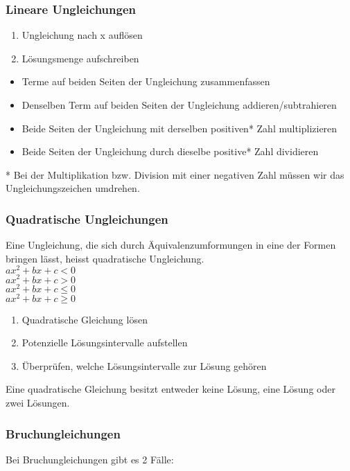 \begin{multicols}{2}
    \subsubsection{Lineare Ungleichungen}
    \vspace{-4mm}
    \begin{enumerate}
        \item Ungleichung nach x auflösen
        \item Lösungsmenge aufschreiben
    \end{enumerate}
    \begin{itemize}
        \item Terme auf beiden Seiten der Ungleichung zusammenfassen
        \item Denselben Term auf beiden Seiten der Ungleichung addieren/subtrahieren
        \item Beide Seiten der Ungleichung mit derselben positiven* Zahl multiplizieren
        \item Beide Seiten der Ungleichung durch dieselbe positive* Zahl dividieren
    \end{itemize}
    * Bei der Multiplikation bzw. Division mit einer negativen Zahl müssen wir das Ungleichungszeichen umdrehen.
    \subsubsection{Quadratische Ungleichungen}
    \vspace{-4mm}
    Eine Ungleichung, die sich durch Äquivalenzumformungen in eine der Formen bringen lässt, heisst quadratische Ungleichung.\\
    $ax^2 + bx + c < 0$\\
    $ax^2 + bx + c > 0$\\
    $ax^2 + bx + c \leq 0$\\
    $ax^2 + bx + c \geq 0$\\
    \begin{enumerate}
        \item Quadratische Gleichung lösen
        \item Potenzielle Lösungsintervalle aufstellen
        \item Überprüfen, welche Lösungsintervalle zur Lösung gehören
    \end{enumerate}
    Eine quadratische Gleichung besitzt entweder keine Lösung, eine Lösung oder zwei Lösungen.
    \subsubsection{Bruchungleichungen}
    \vspace{-4mm}
    Bei Bruchungleichungen gibt es 2 Fälle:


\end{multicols}
